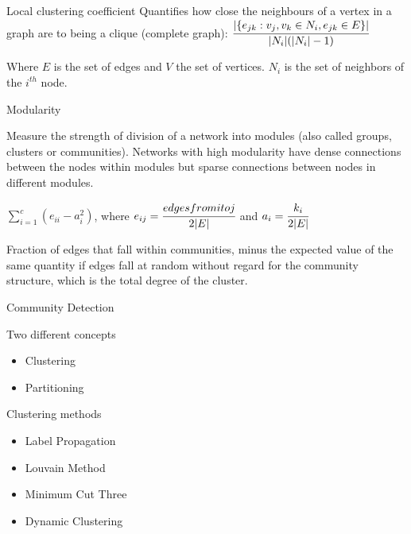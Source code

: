 \documentclass{beamer}
\begin{document}
\begin{frame}

    \begin{block}{Local clustering coefficient}
        Quantifies how close the neighbours of a vertex in a graph are to being a clique (complete graph): $\cfrac{|\{e_{jk} : v_j, v_k \in N_i, e_{jk} \in E\}|}{|N_i|(|N_i| - 1)}$
    \end{block}

    \begin{block}{}
        Where $E$ is the set of edges and $V$ the set of vertices. $N_i$ is the set of neighbors of the $i^{th}$ node.
    \end{block}

\end{frame}

\begin{frame}{Modularity}
    \begin{block}{}
        Measure the strength of division of a network into modules (also called groups, clusters or communities).
        Networks with high modularity have dense connections between the nodes within modules but sparse connections between nodes in different modules.
    \end{block}
    \begin{block}{}
        $\sum_{i=1}^{c}(e_{ii} - a_{i}^{2})$, where $e_{ij} = \cfrac{edges from i to j}{2|E|}$ and $a_i = \cfrac{k_i}{2|E|}$
    \end{block}

    \begin{block}{}
        Fraction of edges that fall within communities, minus the expected value of the same quantity if edges fall at random without regard for the community structure, which is the total degree of the cluster.
    \end{block}
\end{frame}

\begin{frame}{Community Detection}
    \begin{block}{Two different concepts}
        \begin{itemize}
            \item Clustering
            \item Partitioning
        \end{itemize}
    \end{block}
    \begin{block}{Clustering methods}
        \begin{itemize}
            \item Label Propagation
            \item Louvain Method
            \item Minimum Cut Three
            \item Dynamic Clustering
        \end{itemize}
    \end{block}

\end{frame}
\end{document}
